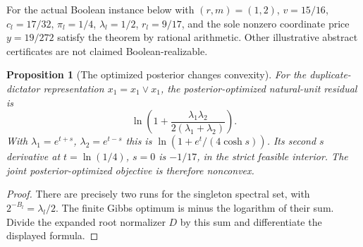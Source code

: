 \documentclass[11pt]{article}
\newtheorem{proposition}{Proposition}
\begin{document}
For the actual Boolean instance below with $(r,m)=(1,2)$,
$v=15/16$, $c_l=17/32$, $\pi_l=1/4$, $\lambda_l=1/2$,
$r_l=9/17$, and the sole nonzero coordinate price $y=19/272$ satisfy
the theorem by rational arithmetic. Other illustrative abstract
certificates are not claimed Boolean-realizable.

\begin{proposition}[The optimized posterior changes convexity]
For the duplicate-dictator representation $x_1=x_1\vee x_1$, the
posterior-optimized natural-unit residual is
\[
 \ln\left(1+\frac{\lambda_1\lambda_2}{2(\lambda_1+\lambda_2)}\right).
\]
With $\lambda_1=e^{t+s}$, $\lambda_2=e^{t-s}$ this is
$\ln(1+e^t/(4\cosh s))$. Its second $s$ derivative at
$t=\ln(1/4)$, $s=0$ is $-1/17$, in the strict feasible interior.
The joint posterior-optimized objective is therefore nonconvex.
\end{proposition}
\begin{proof}
There are precisely two runs for the singleton spectral set, with
$2^{-B_l}=\lambda_l/2$. The finite Gibbs optimum is minus the
logarithm of their sum. Divide the expanded root normalizer $D$
by this sum and differentiate the displayed formula.
\end{proof}
\end{document}
